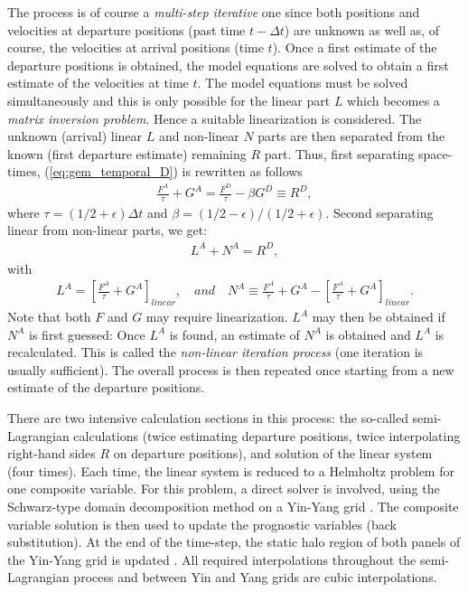 \documentclass[gmd, manuscript]{copernicus}
\begin{document}
\noindent The process is of course a {\it{multi-step iterative}}
one
since both positions and velocities at departure positions (past time $t-\Delta t$)
are unknown as well as, of course, the velocities at arrival positions (time $t$).
Once a first estimate of the departure positions is obtained,
the model equations are solved to obtain a first estimate of the velocities at time $t$.
The model equations must be solved simultaneously and this is only possible for the linear part $L$
which becomes a {\it {matrix inversion problem}}.
Hence a suitable linearization is considered. The unknown (arrival) linear $L$ and non-linear $N$
parts are then separated from the known (first departure estimate) remaining $R$ part.
Thus, first separating space-times, (\ref{eq:gem_temporal_D}) is rewritten as follows
\begin{align}
\frac{F^A} {\tau} + G^A =  \frac{F^{D}} {\tau}- \beta G ^{D} \equiv R^{D},
\label{eq:gem_temporal_AD}
\end{align}
where $\tau = \left ( 1/2 + \epsilon\right)\Delta t$ and $\beta=\left ( 1/2 - \epsilon\right)/\left ( 1/2 + \epsilon\right)$.
Second separating linear from non-linear parts, we get:
\begin{align}
L^A + N^A = R^D,
\label{eq:gem_temporal_LN}
\end{align}
\noindent
with
\begin{align}
L^A=\left[\frac{F^A}{\tau} + G^A \right]_{linear}, \quad and \quad N^A \equiv \frac{F^A}{\tau} + G^A  - \left[\frac{F^A}{\tau} + G^A \right]_{linear}.
\end{align}
Note that both $F$ and $G$ may require linearization. $L^A$ may then be obtained if $N^A$ is first guessed:
Once $L^A$ is found, an estimate of $N^A$ is obtained and $L^A$ is recalculated.
This is called the {\it{non-linear iteration process}}
(one iteration is usually sufficient).
The overall process is then repeated once starting from a new estimate of the departure positions.

There are two intensive calculation sections in this process:
the so-called semi-Lagrangian calculations
(twice estimating departure positions, twice interpolating right-hand sides $R$ on departure positions),
and solution of the linear system (four times).
Each time, the linear system is reduced to a Helmholtz problem for one composite variable.
For this problem, a direct solver is involved, using the Schwarz-type domain decomposition method on a Yin-Yang grid
\citep{Qaddouri2008schwarz}.
The composite variable solution is then used to update the prognostic variables (back substitution).
At the end of the time-step, the static halo region of both panels of the Yin-Yang grid is updated \citep{Qaddouri2011operational}.
All required interpolations throughout the semi-Lagrangian process and between Yin and Yang grids are cubic interpolations.
\end{document}
